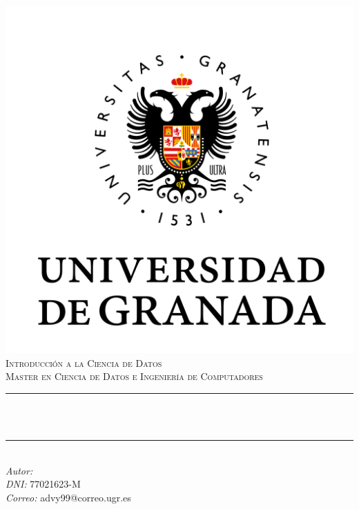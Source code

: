 \documentclass[12pt, spanish]{article}
\begin{document}


\begin{titlepage}
    \centering
    \vspace*{-2cm}
    \includegraphics[scale = 0.50]{ugr.png}\\[0.3 cm]
    \textsc{\large Introducción a la Ciencia de Datos}\\[0.5 cm]
    \textsc{\large Master en Ciencia de Datos e Ingeniería de Computadores}\\[0 cm]
    \rule{\linewidth}{0.2 mm} \\[0.4cm]
    { \Large \bfseries \thetitle}\\
    \rule{\linewidth}{0.2 mm} \\[1 cm]

     {\large
      \emph{Autor: } \theauthor\\
	   \emph{DNI:   }  77021623-M \\
      \emph{Correo:} advy99@correo.ugr.es}


\end{titlepage}
\end{document}
